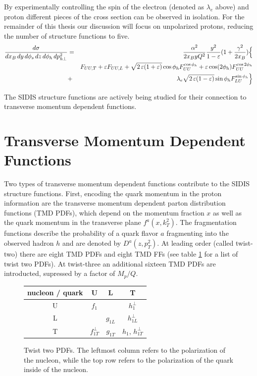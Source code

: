 By experimentally controlling the spin of the electron (denoted as $\lambda_e$ above) and proton different pieces of the cross section can be observed in isolation.  For the remainder of this thesis our discussion will focus on unpolarized protons, reducing the number of structure functions to five.  
\begin{eqnarray}
\frac{d\sigma}{dx_B \, dy\, d\phi_s \,dz\, d\phi_h\, d p_{h\perp}^2}
&=&\frac{\alpha^2}{2x_B y Q^2}
\frac{y^2}{1-\varepsilon}  ( 1+\frac{\gamma^2}{2x_B} ) \Bigl\{  \nonumber \\
&& F_{UU ,T} +  \varepsilon F_{UU ,L}
+ \sqrt{2\,\varepsilon (1+\varepsilon)} \cos\phi_h F_{UU}^{\cos\phi_h}
+ \varepsilon \cos(2\phi_h) F_{UU}^{\cos 2\phi_h} \nonumber \\
&+& \lambda_e
\sqrt{2\,\varepsilon (1-\varepsilon)} \sin\phi_h F_{LU}^{\sin\phi_h}\Bigr\}
\end{eqnarray}

The SIDIS structure functions are actively being studied for their connection to transverse momentum dependent functions.

\section{Transverse Momentum Dependent Functions}
Two types of transverse momentum dependent functions contribute to the SIDIS structure functions.  First, encoding the quark momentum in the proton information are the transverse momentum dependent parton distribution functions (TMD PDFs), which depend on the momentum fraction $x$ as well as the quark momentum in the transverse plane $f^{a}(x, k_{T}^{2})$.  The fragmentation functions describe the probability of a quark flavor $a$ fragmenting into the observed hadron $h$ and are denoted by $D^{a}(z, p_{T}^{2})$.  At leading order (called twist-two) there are eight TMD PDFs and eight TMD FFs (see table \ref{table:twist-two-pdfs} for a list of twist two PDFs).  At twist-three an additional sixteen TMD PDFs are introducted, supressed by a factor of $M_p/Q$.

\begin{figure}
	\centering
	\begin{tabular}{|c|c|c|c|}
		\hline 
		nucleon / quark & U & L & T \\
		\hline
		U & $f_1$ & & $h_1^{\perp}$ \\
		L & & $g_{1L}$ & $h_{1L}^{\perp}$ \\
		T & $f_{1T}^{\perp}$ & $g_{1T}$ & $h_1$, $h_{1T}^{\perp}$ \\ 
		\hline
	\end{tabular}
	\caption[Twist two PDFs]{Twist two PDFs.  The leftmost column refers to the polarization of the nucleon, while the top row refers to the polarization of the quark inside of the nucleon.}
	\label{table:twist-two-pdfs}
\end{figure}

